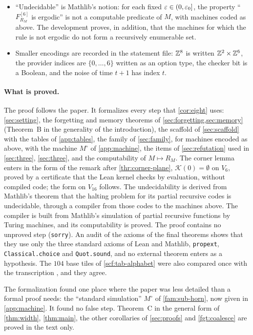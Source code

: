 \begin{itemize}
\item ``Undecidable'' is Mathlib's notion: for each fixed $\varepsilon\in(0,\varepsilon_0]$, the property ``$F^{[6]}_{R_M}$ is ergodic'' is not a computable predicate of $M$, with machines coded as above. The development proves, in addition, that the machines for which the rule is not ergodic do not form a recursively enumerable set.
\item Smaller encodings are recorded in the statement file: $\mathbb{Z}^8$ is written $\mathbb{Z}^2\times\mathbb{Z}^6$, the provider indices are $\{0,\dots,6\}$ written as an option type, the checker bit is a Boolean, and the noise of time $t+1$ has index $t$.
\end{itemize}

\paragraph{What is proved.} The proof follows the paper. It formalizes every step that \cref{cor:eight} uses: \cref{sec:setting}, the forgetting and memory theorems of \cref{sec:forgetting,sec:memory} (Theorem~B in the generality of the introduction), the scaffold of \cref{sec:scaffold} with the tables of \cref{app:tables}, the family of \cref{sec:family}, for machines encoded as above, with the machine $M^\circ$ of \cref{app:machine}, the items of \cref{sec:refutation} used in \cref{sec:three}, \cref{sec:three}, and the computability of $M\mapsto R_M$. The corner lemma enters in the form of the remark after \cref{thr:corner-plane}, $\mathcal K(0)=\emptyset$ on $V_6$, proved by a certificate that the Lean kernel checks by evaluation, without compiled code; the form on $V_{16}$ follows. The undecidability is derived from Mathlib's theorem that the halting problem for its partial recursive codes is undecidable, through a compiler from those codes to the machines above. The compiler is built from Mathlib's simulation of partial recursive functions by Turing machines, and its computability is proved. The proof contains no unproved step (\texttt{sorry}). An audit of the axioms of the final theorems shows that they use only the three standard axioms of Lean and Mathlib, \texttt{propext}, \texttt{Classical.choice} and \texttt{Quot.sound}, and no external theorem enters as a hypothesis. The $104$ base tiles of \cref{scf:tab-alphabet} were also compared once with the transcription \cite{LeanWang}, and they agree.

The formalization found one place where the paper was less detailed than a formal proof needs: the ``standard simulation'' $M^\circ$ of \cref{fam:sub-horn}, now given in \cref{app:machine}. It found no false step. Theorem~C in the general form of \cref{thm:width}, \cref{thm:main}, the other corollaries of \cref{sec:proofs} and \cref{fgt:coalesce} are proved in the text only.

